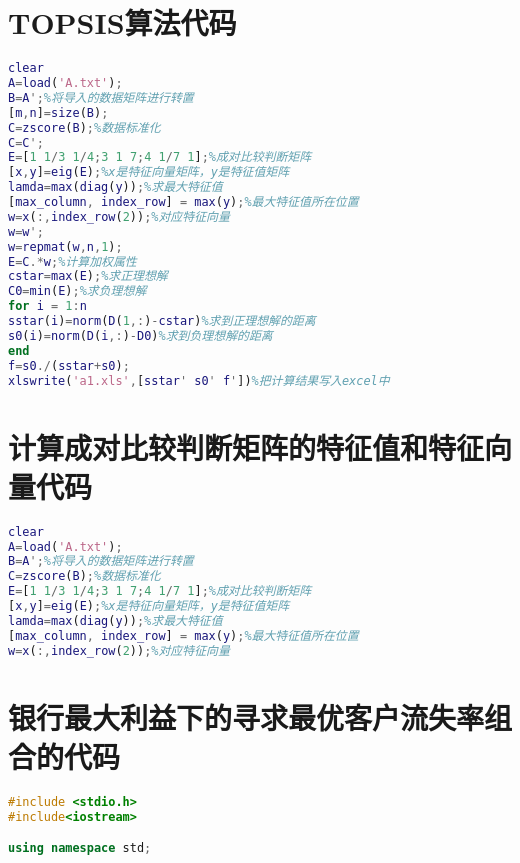 \documentclass{cumcmthesis}
\begin{document}
\begin{appendices}
\section{TOPSIS算法代码}
\begin{lstlisting}[language=matlab]
clear
A=load('A.txt');
B=A';%将导入的数据矩阵进行转置
[m,n]=size(B);
C=zscore(B);%数据标准化
C=C';
E=[1 1/3 1/4;3 1 7;4 1/7 1];%成对比较判断矩阵
[x,y]=eig(E);%x是特征向量矩阵，y是特征值矩阵
lamda=max(diag(y));%求最大特征值
[max_column, index_row] = max(y);%最大特征值所在位置
w=x(:,index_row(2));%对应特征向量
w=w';
w=repmat(w,n,1);
E=C.*w;%计算加权属性
cstar=max(E);%求正理想解
C0=min(E);%求负理想解
for i = 1:n
sstar(i)=norm(D(1,:)-cstar)%求到正理想解的距离
s0(i)=norm(D(i,:)-D0)%求到负理想解的距离
end
f=s0./(sstar+s0);
xlswrite('a1.xls',[sstar' s0' f'])%把计算结果写入excel中
 \end{lstlisting}

\section{计算成对比较判断矩阵的特征值和特征向量代码}

\begin{lstlisting}[language=matlab]
clear
A=load('A.txt');
B=A';%将导入的数据矩阵进行转置
C=zscore(B);%数据标准化
E=[1 1/3 1/4;3 1 7;4 1/7 1];%成对比较判断矩阵
[x,y]=eig(E);%x是特征向量矩阵，y是特征值矩阵
lamda=max(diag(y));%求最大特征值
[max_column, index_row] = max(y);%最大特征值所在位置
w=x(:,index_row(2));%对应特征向量
 \end{lstlisting}

\section{银行最大利益下的寻求最优客户流失率组合的代码}
\begin{lstlisting}[language=c++]
#include <stdio.h>
#include<iostream>

using namespace std;


\end{lstlisting}
\end{appendices}
\end{document}
